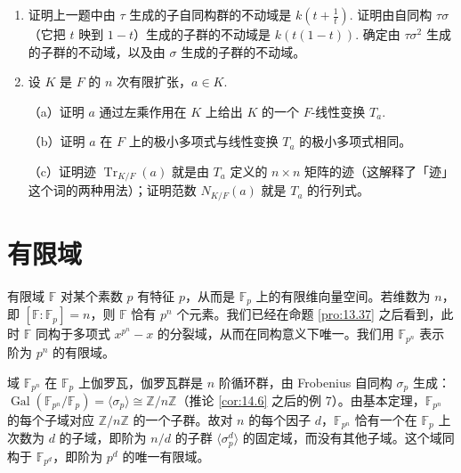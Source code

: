 \begin{enumerate}
（a）证明 \(\sigma\) 与 \(\tau\) 是 \(k(t)\) 的自同构（参见第 14.1 节习题 8），且它们生成的群 \(G = \langle\sigma, \tau\rangle\) 同构于 \(S_3\).

（b）证明元素
\[
\eta = \frac{(t^2-t+1)^3}{t^2(t-1)^2}
\]
被 \(G\) 的所有元素固定。

（c）证明 \(k(\eta)\) 恰为 \(G\) 在 \(k(t)\) 中的不动域〔计算这个扩张的次数〕。

\item 证明上一题中由 \(\tau\) 生成的子自同构群的不动域是 \(k\left(t+\frac{1}{t}\right)\). 证明由自同构 \(\tau\sigma\)（它把 \(t\) 映到 \(1-t\)）生成的子群的不动域是 \(k(t(1-t))\). 确定由 \(\tau\sigma^2\) 生成的子群的不动域，以及由 \(\sigma\) 生成的子群的不动域。

\item 设 \(K\) 是 \(F\) 的 \(n\) 次有限扩张，\(a \in K\).

（a）证明 \(a\) 通过左乘作用在 \(K\) 上给出 \(K\) 的一个 \(F\)-线性变换 \(T_a\).

（b）证明 \(a\) 在 \(F\) 上的极小多项式与线性变换 \(T_a\) 的极小多项式相同。

（c）证明迹 \(\operatorname{Tr}_{K/F}(a)\) 就是由 \(T_a\) 定义的 \(n \times n\) 矩阵的迹（这解释了「迹」这个词的两种用法）；证明范数 \(N_{K/F}(a)\) 就是 \(T_a\) 的行列式。
\end{enumerate}

\section{有限域}

有限域 \(\mathbb{F}\) 对某个素数 \(p\) 有特征 \(p\)，从而是 \(\mathbb{F}_p\) 上的有限维向量空间。若维数为 \(n\)，即 \([\mathbb{F}:\mathbb{F}_p] = n\)，则 \(\mathbb{F}\) 恰有 \(p^n\) 个元素。我们已经在命题 \ref{pro:13.37} 之后看到，此时 \(\mathbb{F}\) 同构于多项式 \(x^{p^n}-x\) 的分裂域，从而在同构意义下唯一。我们用 \(\mathbb{F}_{p^n}\) 表示阶为 \(p^n\) 的有限域。

域 \(\mathbb{F}_{p^n}\) 在 \(\mathbb{F}_p\) 上伽罗瓦，伽罗瓦群是 \(n\) 阶循环群，由 Frobenius 自同构 \(\sigma_p\) 生成：\(\operatorname{Gal}(\mathbb{F}_{p^n}/\mathbb{F}_p) = \langle \sigma_p \rangle \cong \mathbb{Z}/n\mathbb{Z}\)（推论 \ref{cor:14.6} 之后的例 7）。由基本定理，\(\mathbb{F}_{p^n}\) 的每个子域对应 \(\mathbb{Z}/n\mathbb{Z}\) 的一个子群。故对 \(n\) 的每个因子 \(d\)，\(\mathbb{F}_{p^n}\) 恰有一个在 \(\mathbb{F}_p\) 上次数为 \(d\) 的子域，即阶为 \(n/d\) 的子群 \(\langle \sigma_p^d \rangle\) 的固定域，而没有其他子域。这个域同构于 \(\mathbb{F}_{p^d}\)，即阶为 \(p^d\) 的唯一有限域。

